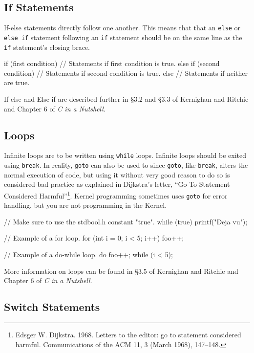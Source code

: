 \documentclass[11pt]{article}
\begin{document}
\subsection{If Statements}

If-else statements directly follow one another. This means that that an
\texttt{else} or \texttt{else if} statement following an \texttt{if} statement
should be on the same line as the \texttt{if} statement's closing brace.

\begin{codelisting}{}
if (first condition) {
    // Statements if first condition is true.
} else if (second condition) {
    // Statements if second condition is true.
} else {
    // Statements if neither are true.
}
\end{codelisting}

If-else and Else-if are described further in \S 3.2 and \S 3.3 of Kernighan and
Ritchie and Chapter 6 of \emph{C in a Nutshell}.


\subsection{Loops}

Infinite loops are to be written using \texttt{while} loops. Infinite loops
should be exited using \texttt{break}. In reality, \texttt{goto} can also be
used to since \texttt{goto}, like \texttt{break}, alters the normal execution of
code, but using it without very good reason to do so is considered bad practice
as explained in Dijkstra's letter, ``Go To Statement Considered
Harmful''\footnote{Edsger W. Dijkstra. 1968. Letters to the editor: go to
  statement considered harmful. Communications of the ACM 11, 3 (March 1968),
147--148.}. Kernel programming sometimes uses \texttt{goto} for error handling, 
but you are not programming in the Kernel.

\begin{codelisting}{}
// Make sure to use the stdbool.h constant "true".
while (true) {
    printf("Deja vu");
}

// Example of a for loop.
for (int i = 0; i < 5; i++) {
    foo++;
}

// Example of a do-while loop.
do {
    foo++;
} while (i < 5);
\end{codelisting}

 More information on loops can be found in \S 3.5 of Kernighan and Ritchie and
Chapter 6 of \emph{C in a Nutshell}.


\subsection{Switch Statements}
\end{document}
